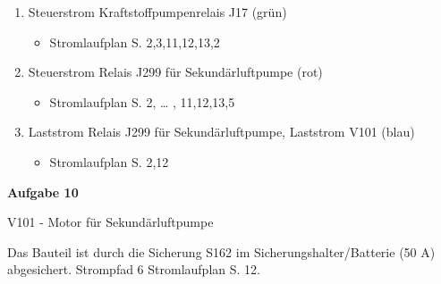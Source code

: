 \begin{enumerate}
\item
  Steuerstrom Kraftstoffpumpenrelais J17 (grün)

  \begin{itemize}
  \item
    Stromlaufplan S. 2,3,11,12,13,2
  \end{itemize}
\item
  Steuerstrom Relais J299 für Sekundärluftpumpe (rot)

  \begin{itemize}
  \item
    Stromlaufplan S. 2, \ldots{} , 11,12,13,5
  \end{itemize}
\item
  Laststrom Relais J299 für Sekundärluftpumpe, Laststrom V101 (blau)

  \begin{itemize}
  \item
    Stromlaufplan S. 2,12
  \end{itemize}
\end{enumerate}

\textbf{Aufgabe 10}

V101 - Motor für Sekundärluftpumpe

Das Bauteil ist durch die Sicherung S162 im Sicherungshalter/Batterie
(50 A) abgesichert. Strompfad 6 Stromlaufplan S. 12.
